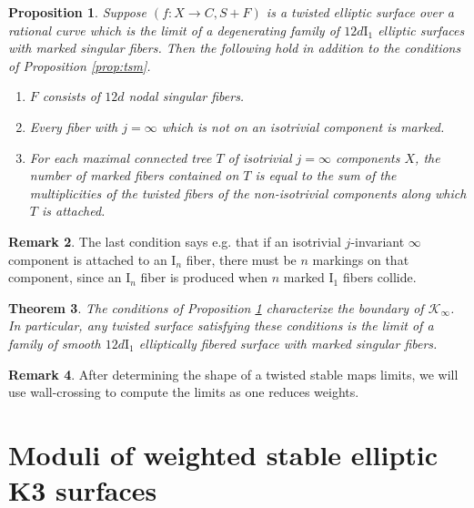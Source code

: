 \documentclass[11pt]{amsart}
\newtheorem{theorem}{Theorem}[section]
\newtheorem{prop}[theorem]{Proposition}
\theoremstyle{definition}
\newtheorem{remark}[theorem]{Remark}
\theoremstyle{remark}
\newcommand{\calK}{\mathcal K}
\begin{document}
	\begin{prop}\label{prop:tsm2} Suppose $(f : X \to C, S + F)$ is a twisted elliptic surface over a rational curve which is the limit of a degenerating family of $12d\mathrm{I}_1$ elliptic surfaces with marked singular fibers. Then the following hold in addition to the conditions of Proposition \ref{prop:tsm}. 
		
		\begin{enumerate}
			\item $F$ consists of $12d$ nodal singular fibers.
			\item Every fiber with $j = \infty$ which is not on an isotrivial component is marked. 
			\item For each maximal connected tree $T$ of isotrivial $j = \infty$ components $X$, the number of marked fibers contained on $T$ is equal to the sum of the multiplicities of the twisted fibers of the non-isotrivial components along which $T$ is attached.
		\end{enumerate}
	\end{prop}
	
	\begin{remark} The last condition says e.g. that if an isotrivial $j$-invariant $\infty$ component is attached to an $\mathrm{I}_n$ fiber, there must be $n$ markings on that component, since an $\mathrm{I}_n$ fiber is produced when $n$ marked $\mathrm{I}_1$ fibers collide. \end{remark} 
	
	
	
	\begin{theorem}\cite[Theorems 1.7 \& 1.8]{tsm2}\label{thm:tsm2} The conditions of Proposition \ref{prop:tsm2} characterize the boundary of $\calK_\infty$. In particular, any twisted surface satisfying these conditions is the limit of a family of smooth $12d\mathrm{I}_1$ elliptically fibered surface with marked singular fibers. 
	\end{theorem} 
	
	
	
	\begin{remark} 
		
		After determining the shape of a twisted stable maps limits, we will use wall-crossing to compute the limits as one reduces weights.
	\end{remark} 
	
	
	\section{Moduli of weighted stable elliptic K3 surfaces}\label{sec:weightedstable}
	
\end{document}
